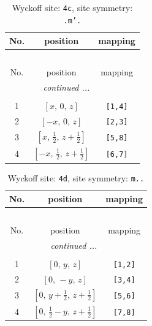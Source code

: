 \documentclass[fleqn,8pt]{jsarticle}
\begin{document}
\renewcommand{\arraystretch}{1.2}
\begin{longtable}{ccc}
\caption{Wyckoff site: {\tt 4c}, site symmetry: {\tt .m'.}}
 \\
 \hline \hline
No. & position & mapping \\ \hline \endfirsthead

\multicolumn{2}{l}{\tablename\ \thetable{}} \\
 \hline \hline
No. & position & mapping \\ \hline \endhead

 \hline \hline
\multicolumn{2}{r}{\footnotesize\it continued ...} \\ \endfoot

 \hline \hline
\multicolumn{2}{r}{} \\ \endlastfoot

1 & $\left[ x,\, 0,\, z \right]$ & {\tt [1,4]} \\ \hline
2 & $\left[ - x,\, 0,\, z \right]$ & {\tt [2,3]} \\ \hline
3 & $\left[ x,\, \frac{1}{2},\, z + \frac{1}{2} \right]$ & {\tt [5,8]} \\ \hline
4 & $\left[ - x,\, \frac{1}{2},\, z + \frac{1}{2} \right]$ & {\tt [6,7]} \\
\end{longtable}
\renewcommand{\arraystretch}{1.2}
\begin{longtable}{ccc}
\caption{Wyckoff site: {\tt 4d}, site symmetry: {\tt m..}}
 \\
 \hline \hline
No. & position & mapping \\ \hline \endfirsthead

\multicolumn{2}{l}{\tablename\ \thetable{}} \\
 \hline \hline
No. & position & mapping \\ \hline \endhead

 \hline \hline
\multicolumn{2}{r}{\footnotesize\it continued ...} \\ \endfoot

 \hline \hline
\multicolumn{2}{r}{} \\ \endlastfoot

1 & $\left[ 0,\, y,\, z \right]$ & {\tt [1,2]} \\ \hline
2 & $\left[ 0,\, - y,\, z \right]$ & {\tt [3,4]} \\ \hline
3 & $\left[ 0,\, y + \frac{1}{2},\, z + \frac{1}{2} \right]$ & {\tt [5,6]} \\ \hline
4 & $\left[ 0,\, \frac{1}{2} - y,\, z + \frac{1}{2} \right]$ & {\tt [7,8]} \\
\end{longtable}
\end{document}
